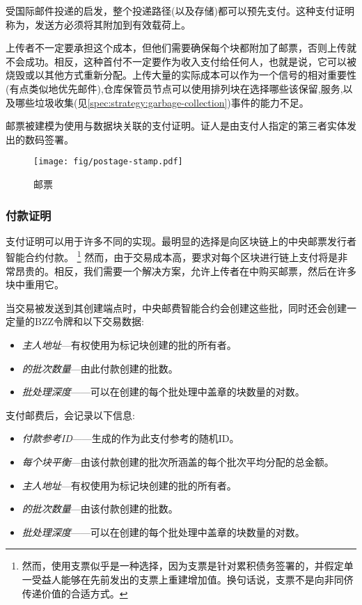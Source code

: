 受国际邮件投递的启发，整个投递路径(以及存储)都可以预先支付。这种支付证明称为，发送方必须将其附加到有效载荷上。

上传者不一定要承担这个成本，但他们需要确保每个块都附加了邮票，否则上传就不会成功。相反，这种首付不一定要作为收入支付给任何人，也就是说，它可以被烧毁或以其他方式重新分配。上传大量的实际成本可以作为一个信号的相对重要性(有点类似地优先邮件),仓库保管员节点可以使用排列块在选择哪些该保留,服务,以及哪些垃圾收集(见\ref{spec:strategy:garbage-collection})事件的能力不足。

邮票被建模为使用与数据块关联的支付证明。证人是由支付人指定的第三者实体发出的数码签署。


\begin{figure}[htbp]
\centering
  \texttt{[image: fig/postage-stamp.pdf]}
\caption[邮票\statusgreen]{邮票}
\label{fig:postage-stamps}
\end{figure}

\subsubsection{付款证明}

支付证明可以用于许多不同的实现。最明显的选择是向区块链上的中央邮票发行者智能合约付款。%
%
\footnote{然而，使用支票似乎是一种选择，因为支票是针对累积债务签署的，并假定单一受益人能够在先前发出的支票上重建增加值。换句话说，支票不是向非同侪传递价值的合适方式。}
%
然而，由于交易成本高，要求对每个区块进行链上支付将是非常昂贵的。相反，我们需要一个解决方案，允许上传者在中购买邮票，然后在许多块中重用它。 


当交易被发送到其创建端点时，中央邮费智能合约会创建这些批，同时还会创建一定量的BZZ令牌和以下交易数据:

\begin{itemize}
\item \emph{主人地址}—有权使用为标记块创建的批的所有者。
\item \emph{的批次数量}—由此付款创建的批数。
\item \emph{批处理深度}——可以在创建的每个批处理中盖章的块数量的对数。
\end{itemize}

支付邮费后，会记录以下信息:

\begin{itemize}
\item \emph{付款参考ID}——生成的作为此支付参考的随机ID。
\item \emph{每个块平衡}—由该付款创建的批次所涵盖的每个批次平均分配的总金额。
\item \emph{主人地址}—有权使用为标记块创建的批的所有者。
\item \emph{的批次数量}—由该付款创建的批数。
\item \emph{批处理深度}——可以在创建的每个批处理中盖章的块数量的对数。
\end{itemize}


